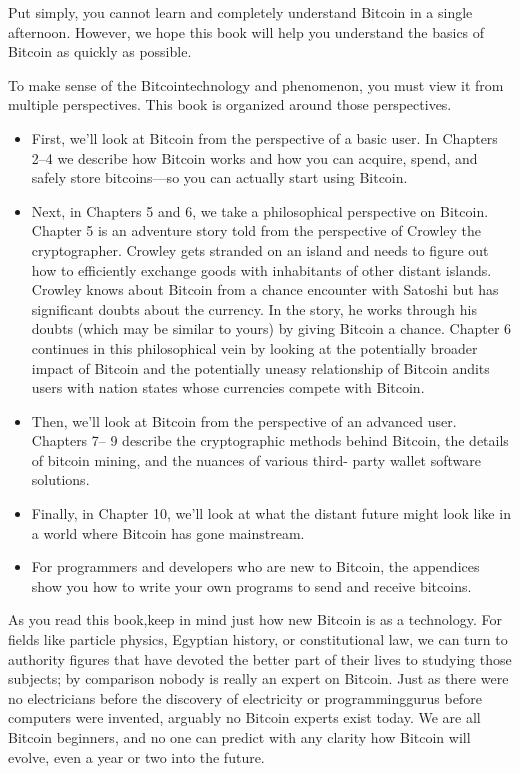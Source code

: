 \par Put simply, you cannot learn and completely understand Bitcoin in a single afternoon. However, we hope this book will help you understand the basics of Bitcoin as quickly as possible.

\par To make sense of the Bitcointechnology and phenomenon, you must view it from multiple perspectives. This book is organized around those perspectives.
  \begin{itemize}
    \item First, we’ll look at Bitcoin from the perspective of a basic user. In Chapters 2–4 we describe how Bitcoin works and how you can acquire, spend, and safely store bitcoins—so you can actually start using Bitcoin.
    \item Next, in Chapters 5 and 6, we take a philosophical perspective on Bitcoin. Chapter 5 is an adventure story told from the perspective of Crowley the cryptographer. Crowley gets stranded on an island and needs to figure out how to efficiently exchange goods with inhabitants of other distant islands. Crowley knows about Bitcoin from a chance encounter with Satoshi but has significant doubts about the currency. In the story, he works through his doubts (which may be similar to yours) by giving Bitcoin a chance. Chapter 6 continues in this philosophical vein by looking at the potentially broader impact of Bitcoin and the potentially uneasy relationship of Bitcoin andits users with nation states whose currencies compete with Bitcoin.
    \item Then, we’ll look at Bitcoin from the perspective of an advanced user. Chapters 7– 9 describe the cryptographic methods behind Bitcoin, the details of bitcoin mining, and the nuances of various third- party wallet software solutions.
    \item Finally, in Chapter 10, we’ll look at what the distant future might look like in a world where Bitcoin has gone mainstream.
    \item For programmers and developers who are new to Bitcoin, the appendices show you how to write your own programs to send and receive bitcoins.
  \end{itemize}

\par As you read this book,keep in mind just how new Bitcoin is as a technology. For fields like particle physics, Egyptian history, or constitutional law, we can turn to authority figures that have devoted the better part of their lives to studying those subjects; by comparison nobody is really an expert on Bitcoin. Just as there were no electricians before the discovery of electricity or programminggurus before computers were invented, arguably no Bitcoin experts exist today. We are all Bitcoin beginners, and no one can predict with any clarity how Bitcoin will evolve, even a year or two into the future.

